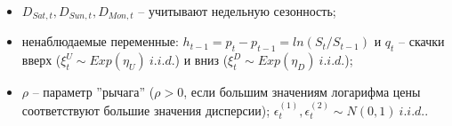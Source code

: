 \documentclass[c, dvipsnames]{beamer}  %
\begin{document}
\begin{frame}[shrink=5]
{\begin{itemize}
		\item  $D_{ Sat, t}, D_{ Sun, t}, D_{ Mon, t}$  -- учитывают недельную сезонность;
		
		\item  ненаблюдаемые переменные:  $h_{t-1} = p_{t} - p_{ t-1} = ln(S_{ t}/S_{ t-1} ) $ и  $q_{t}$ -- скачки вверх  ($\xi_{ t}^U \sim Exp(\eta_U) \ i.i.d. $) и вниз  ($\xi_{ t}^D \sim Exp(\eta_D) \ i.i.d. $);
		
		\item  $\rho$ -- параметр ''рычага'' ($\rho > 0$, если большим значениям логарифма цены  соответствуют большие значения дисперсии);
		$\epsilon_{ t }^{(1)}, \epsilon_{ t }^{(2)} \sim N(0,1) \ i.i.d.$.
		
		
		
		
	\end{itemize}
	
}

\end{frame}
























%
%
%
%
%
%
%
%


%
%
%
%
%
%
%
%

%
%
%
%
%
%
%
\end{document}
